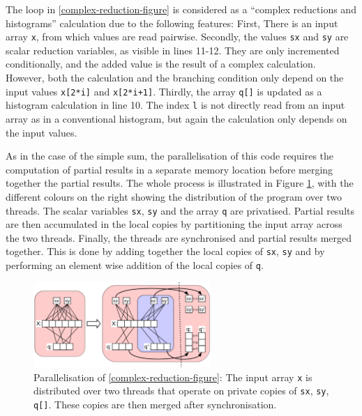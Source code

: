     The loop in \ref{complex-reduction-figure} is considered as a
    ``complex reductions and histograms'' calculation due to the following
    features:
    First, There is an input array \texttt{x}, from which values are read
    pairwise.
    Secondly, the values \texttt{sx} and \texttt{sy} are scalar reduction
    variables, as visible in lines 11-12.
    They are only incremented conditionally, and the added value is the result
    of a complex calculation.
    However, both the calculation and the branching condition only depend on the
    input values \texttt{x[2*i]} and \texttt{x[2*i+1]}.
    Thirdly, the array \texttt{q[]} is updated as a histogram calculation in
    line 10.
    The index \texttt{l} is not directly read from an input array as in a
    conventional histogram, but again the calculation only depends on the input
    values.

    As in the case of the simple sum, the parallelisation of this code
    requires the computation of partial results in a separate memory
    location before merging together the partial results.
    The whole process is illustrated in Figure \ref{nice-picture}, with the
    different colours on the right showing the distribution of the program
    over two threads.
    The scalar variables \texttt{sx}, \texttt{sy} and the array \texttt{q} are
    privatised.
    Partial results are then accumulated in the local copies by partitioning the
    input array across the two threads. 
    Finally, the threads are synchronised and partial results merged together.
    This is done by adding together the local copies of \texttt{sx}, \texttt{sy}
    and by performing an element wise addition of the local copies of
    \texttt{q}. 

\begin{figure}[t]
\centering
\includegraphics[width=0.6\textwidth]{figures/nicepicture.png}
\caption{Parallelisation of \autoref{complex-reduction-figure}:
         The input array \texttt{x} is distributed over two threads that operate
         on private copies of \texttt{sx}, \texttt{sy}, \texttt{q[]}.
         These copies are then merged after synchronisation.\parfillskip=0pt}
\label{nice-picture}
\end{figure}



